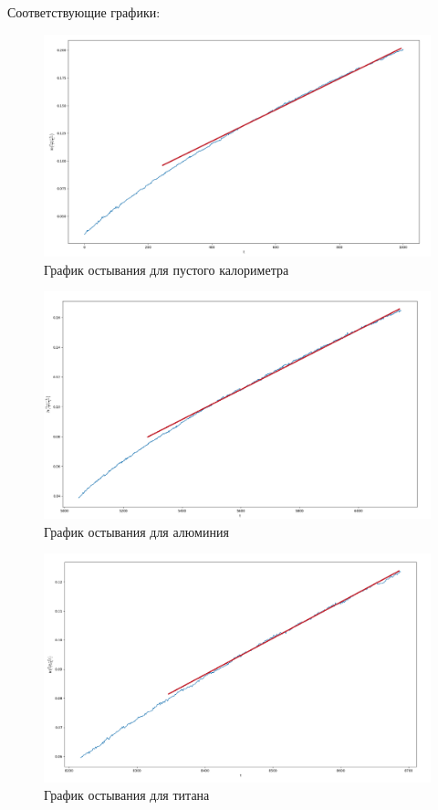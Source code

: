 \documentclass[a4paper]{article}
\begin{document}
Соответствующие графики:
\begin{figure}[h!]
    \includegraphics[scale=0.3]{empty.png}
    \caption{График остывания для пустого калориметра}
\end{figure}

\begin{figure}[h!]
    \includegraphics[scale=0.3]{alum.png}
    \caption{График остывания для алюминия}
\end{figure}

\begin{figure}[h!]
    \includegraphics[scale=0.3]{tit.png}
    \caption{График остывания для титана}
\end{figure}
\end{document}
